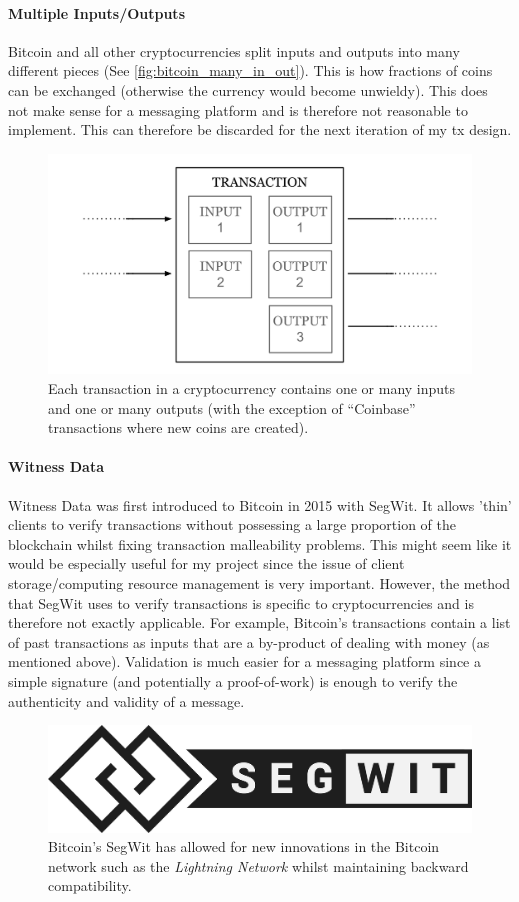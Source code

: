 \documentclass{article}
\begin{document}
\paragraph{Multiple Inputs/Outputs}
Bitcoin and all other cryptocurrencies split inputs and outputs into many different pieces (See \autoref{fig:bitcoin_many_in_out}). This is how fractions of coins can be exchanged (otherwise the currency would become unwieldy). This does not make sense for a messaging platform and is therefore not reasonable to implement. This can therefore be discarded for the next iteration of my tx design.
\begin{figure}[h]
    \centering
    \includegraphics[width=0.75\linewidth]{Images/Diagrams/blockchain_many_inputs_outputs.png}
    \caption{Each transaction in a cryptocurrency contains one or many inputs and one or many outputs (with the exception of ``Coinbase'' transactions where new coins are created).}
    \label{fig:bitcoin_many_in_out}
\end{figure}

\paragraph{Witness Data}
Witness Data was first introduced to Bitcoin in 2015 with SegWit\cite{bitcoin_segwit}. It allows 'thin' clients to verify transactions without possessing a large proportion of the blockchain whilst fixing transaction malleability problems. This might seem like it would be especially useful for my project since the issue of client storage/computing resource management is very important. However, the method that SegWit uses to verify transactions is specific to cryptocurrencies and is therefore not exactly applicable. For example, Bitcoin's transactions contain a list of past transactions as inputs that are a by-product of dealing with money (as mentioned above). Validation is much easier for a messaging platform since a simple signature (and potentially a proof-of-work) is enough to verify the authenticity and validity of a message.
\begin{figure}[ht]
    \centering
    \includegraphics[width=0.65\linewidth]{Images/Segwit.png}
    \caption{Bitcoin's SegWit has allowed for new innovations in the Bitcoin network such as the \textit{Lightning Network}\cite{bitcoin_lightning_network} whilst maintaining backward compatibility.}
    \label{fig:segwit}
\end{figure}
\newpage
\end{document}
